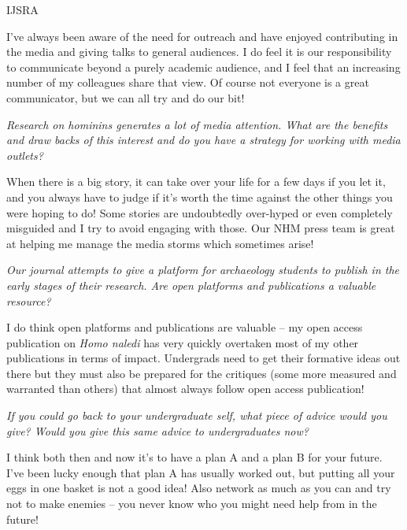 \documentclass{ijsra}
\begin{document}
\begin{labeling}{IJSRA}
\item[CS]
I’ve always been aware of the need for outreach and have enjoyed contributing in the media and
giving talks to general audiences.
I do feel it is our responsibility to communicate beyond a purely academic audience, and I feel that an increasing number of
my colleagues share that view. 
Of course not everyone is a great communicator, but we can all try and do our bit!

\item[IJSRA]
\emph{Research on hominins generates a lot of media attention.
What are the benefits and draw backs of this interest and do you have a strategy for working with media outlets?}

\item[CS]
When there is a big story, it can take over your life for a few days if you let it,
and you always have to judge if it’s worth the time against the other things you were hoping to do!
Some stories are undoubtedly over-hyped or even completely misguided and I try to avoid engaging with those.
Our NHM press team is great at helping me manage the media storms which sometimes arise!

\item[IJSRA]
\emph{Our journal attempts to give a platform for archaeology students to publish in the early stages of their research.
Are open platforms and publications a valuable resource?}

\item[CS]
I do think open platforms and publications are valuable – my open access publication on \emph{Homo naledi} has
very quickly overtaken most of my other publications in terms of impact.
Undergrads need to get their formative ideas out there but they must also be prepared for the critiques
(some more measured and warranted than others) that almost always follow open access publication!

\item[IJSRA]
\emph{If you could go back to your undergraduate self, what piece of advice would you give?
Would you give this same advice to undergraduates now?}

\item[CS]
I think both then and now it’s to have a plan A and a plan B for your future.
I’ve been lucky enough that plan A has usually worked out, but putting all your eggs in one basket is not a good idea!
Also network as much as you can and try not to make enemies – you never know who you might need help from in the future!

\end{labeling}
\IJSRAclosing
\end{document}
